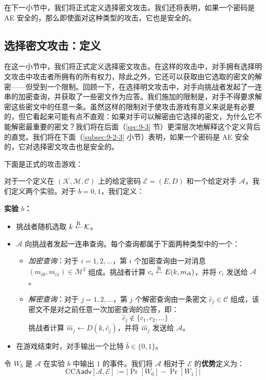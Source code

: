 在下一小节中，我们将正式定义选择密文攻击。我们还将表明，如果一个密码是 AE 安全的，那么即使面对这种类型的攻击，它也是安全的。
 
\subsection{选择密文攻击：定义}\label{subsec:9-2-2}

在这一小节中，我们将正式定义选择密文攻击。在这样的攻击中，对手拥有选择明文攻击中攻击者所拥有的所有权力，除此之外，它还可以获取由它选取的密文的解密——但受到一个限制。回顾一下，在选择明文攻击中，对手向挑战者发起了一连串的加密查询，并获取了一些密文作为应答。我们施加的限制是，对手不得要求解密这些密文中的任意一条。虽然这样的限制对于使攻击游戏有意义来说是有必要的，但它看起来可能有点不直观：如果对手可以解密由它选择的密文，为什么它不能解密最重要的密文？我们将在后面（\ref{sec:9-3} 节）更深层次地解释这个定义背后的直觉。我们将在下面（\ref{subsec:9-2-3} 小节）表明，如果一个密码是 AE 安全的，它对选择密文攻击也是安全的。

下面是正式的攻击游戏：

\begin{game}\label{game:9-2}
对于一个定义在 $(\mathcal{K},\mathcal{M},\mathcal{C})$ 上的给定密码 $\mathcal{E}=(E,D)$ 和一个给定对手 $\mathcal{A}$，我们定义两个实验。对于 $b=0,1$，我们定义：

\vspace*{5pt}

\noindent\textbf{实验 $b$：}
\begin{itemize}
	\item 挑战者随机选取 $k\overset{\rm R}\leftarrow\mathcal{K}$。
	\item $\mathcal{A}$ 向挑战者发起一连串查询。每个查询都属于下面两种类型中的一个：
	\begin{itemize}
		\item \emph{加密查询}：对于 $i=1,2,\dots$，第 $i$ 个加密查询由一对消息 $(m_{i0},m_{i1})\in\mathcal{M}^2$ 组成。挑战者计算 $c_i\overset{\rm R}\leftarrow E(k,m_{ib})$，并将 $c_i$ 发送给 $\mathcal{A}$。
		\item \emph{解密查询}：对于 $j=1,2,\dots$，第 $j$ 个解密查询由一条密文 $\hat{c}_j\in\mathcal{C}$ 组成，该密文不是对之前任意一次加密查询的应答，即：
			\[
			\hat{c}_j\notin\{c_1,c_2,\dots\}
			\]
		挑战者计算 $\hat{m}_j\leftarrow D(k,\hat{c}_j)$，并将 $\hat{m}_j$ 发送给 $\mathcal{A}$。
	\end{itemize}
	\item 在游戏结束时，对手输出一个比特 $\hat{b}\in\{0,1\}$。
\end{itemize}
令 $W_b$ 是 $\mathcal{A}$ 在实验 $b$ 中输出 $1$ 的事件。我们将 $\mathcal{A}$ 相对于 $\mathcal{E}$ 的\textbf{优势}定义为：
\[
\mathrm{CCA}\mathsf{adv}[\mathcal{A},\mathcal{E}]
:=
\big\lvert
\Pr[W_0]-\Pr[W_1]
\big\rvert
\]
\end{game}

